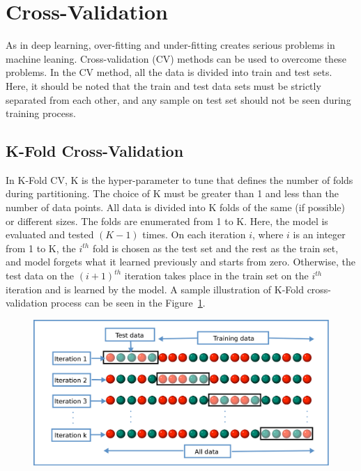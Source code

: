 \section{Cross-Validation}

As in deep learning, over-fitting and under-fitting creates serious problems in machine leaning. Cross-validation (CV) methods can be used to overcome these problems. In the CV method, all the data is divided into train and test sets. Here, it should be noted that the train and test data sets must be strictly separated from each other, and any sample on test set should not be seen during training process.

\subsection{K-Fold Cross-Validation}

In K-Fold CV, K is the hyper-parameter to tune that defines the number of folds during partitioning. The choice of K must be greater than 1 and less than the number of data points. All data is divided into K folds of the same (if possible) or different sizes. The folds are enumerated from 1 to K. Here, the model is evaluated and tested $(K-1)$ times. On each iteration $i$, where $i$ is an integer from 1 to K, the $i^{th}$ fold is chosen as the test set and the rest as the train set, and model forgets what it learned previously and starts from zero. Otherwise, the test data on the $(i+1)^{th}$ iteration takes place in the train set on the $i^{th}$ iteration and is learned by the model. A sample illustration of K-Fold cross-validation process can be seen in the Figure~\ref{k_fold_cv}.

\begin{figure}[h]
	\centering
	\includegraphics[width=.8\linewidth]{fig/k_fold_cv.png}
	\vspace*{2mm}
	\label{k_fold_cv}
\end{figure}

